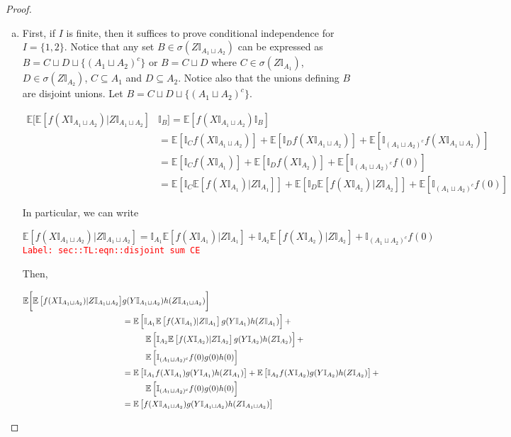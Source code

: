 \documentclass[12pt]{article}
\newcommand{\mb}{\mathbb}
\newcommand{\tr}{\textcolor{red}}
\newcommand{\labe}[1]{\tr{\texttt{Label: #1}}}
\newcommand{\ex}[1]{\mb{E}\left[#1\right]}			%
\begin{document}
\begin{proof}
\begin{enumerate}[(a)]
\item First, if \(I\) is finite, then it suffices to prove conditional independence for \(I =\{1,2\}\). Notice that any set \(B \in \sigma(Z\mb{I}_{A_1\sqcup A_2})\) can be expressed as \(B = C\sqcup D\sqcup\{(A_1\sqcup A_2)^c\}\) or \(B = C\sqcup D\) where \(C\in \sigma(Z\mb{I}_{A_1})\), \(D \in \sigma(Z\mb{I}_{A_2})\), \(C \subseteq A_1\) and \(D \subseteq A_2\). Notice also that the unions defining \(B\) are disjoint unions. Let \(B = C\sqcup D\sqcup \{(A_1\sqcup A_2)^c\}\).

\begin{align*}
\mb{E}\bigg[\ex{f(X\mb{I}_{A_1\sqcup A_2})|Z\mb{I}_{A_1\sqcup A_2}}&\mb{I}_B\bigg]= \ex{f(X\mb{I}_{A_1\sqcup A_2})\mb{I}_B}\\
&= \ex{\mb{I}_Cf(X\mb{I}_{A_1\sqcup A_2})} + \ex{\mb{I}_Df(X\mb{I}_{A_1\sqcup A_2})} + \ex{\mb{I}_{(A_1\sqcup A_2)^c}f(X\mb{I}_{A_1\sqcup A_2})}\\
&= \ex{\mb{I}_C f(X\mb{I}_{A_1})} + \ex{\mb{I}_D f(X\mb{I}_{A_2})} + \ex{\mb{I}_{(A_1\sqcup A_2)^c}f(0)}\\
&= \ex{\mb{I}_{C}\ex{f(X\mb{I}_{A_1})|Z\mb{I}_{A_1}}} + \ex{\mb{I}_{D}\ex{f(X\mb{I}_{A_2})|Z\mb{I}_{A_2}}} + \ex{\mb{I}_{(A_1\sqcup A_2)^c}f(0)}
\end{align*}

In particular, we can write

\begin{equation}
\ex{f(X\mb{I}_{A_1\sqcup A_2})|Z\mb{I}_{A_1\sqcup A_2}} = \mb{I}_{A_1}\ex{f(X\mb{I}_{A_1})|Z\mb{I}_{A_1}} + \mb{I}_{A_2}\ex{f(X\mb{I}_{A_2})|Z\mb{I}_{A_2}} + \mb{I}_{(A_1\sqcup A_2)^c}f(0)
\label{sec::TL:eqn::disjoint sum CE}
\end{equation}
\labe{sec::TL:eqn::disjoint sum CE}

Then,

\begin{align*}
\mb{E}\bigg[\ex{f(X\mb{I}_{A_1\sqcup A_2})|Z\mb{I}_{A_1\sqcup A_2}}&g(Y\mb{I}_{A_1\sqcup A_2})h(Z\mb{I}_{A_1\sqcup A_2})\bigg]\\
&= \ex{\mb{I}_{A_1}\ex{f(X\mb{I}_{A_1})|Z\mb{I}_{A_1}}g(Y\mb{I}_{A_1})h(Z\mb{I}_{A_1})} +\\
&\hspace{1 cm} \ex{\mb{I}_{A_2}\ex{f(X\mb{I}_{A_2})|Z\mb{I}_{A_2}}g(Y\mb{I}_{A_2})h(Z\mb{I}_{A_2})} + \\
&\hspace{1 cm} \ex{\mb{I}_{(A_1\sqcup A_2)^c}f(0)g(0)h(0)}\\
&= \ex{\mb{I}_{A_1}f(X\mb{I}_{A_1})g(Y\mb{I}_{A_1})h(Z\mb{I}_{A_1})} + \ex{\mb{I}_{A_2}f(X\mb{I}_{A_2})g(Y\mb{I}_{A_2})h(Z\mb{I}_{A_2})} +\\
&\hspace{1 cm} \ex{\mb{I}_{(A_1\sqcup A_2)^c}f(0)g(0)h(0)}\\
&= \ex{f(X\mb{I}_{A_1\sqcup A_2})g(Y\mb{I}_{A_1\sqcup A_2})h(Z\mb{I}_{A_1\sqcup A_2})}
\end{align*}


\end{enumerate}
\end{proof}
\end{document}
